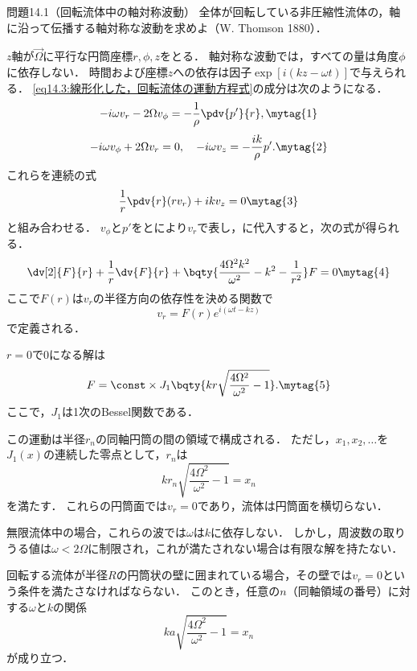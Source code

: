 \begin{mondai}{}{問題14.1（回転流体中の軸対称波動）}
全体が回転している非圧縮性流体の，軸に沿って伝播する軸対称な波動を求めよ（W. Thomson 1880）．
\end{mondai}
\begin{kaitou}
$z$軸が$\vec{\Omega}$に平行な円筒座標$r,\phi,z$をとる．
軸対称な波動では，すべての量は角度$\phi$に依存しない．
時間および座標$z$への依存は因子$\exp[i(kz-\omega t)]$で与えられる．
\eqref{eq14.3:線形化した，回転流体の運動方程式}の成分は次のようになる．
\[
  -i\omega v_r-2\Omega v_\phi = -\frac{1}{\rho} \pdv{p'}{r} ,
  \mytag{1}  
\]
\[
    -i\omega v_\phi + 2\Omega v_r = 0, \quad -i\omega v_z = - \frac{ik}{\rho} p' .
    \mytag{2}
\]
これらを連続の式
\[
    \frac{1}{r} \pdv{r} (rv_r) + ik v_z = 0
    \mytag{3}
\]
と組み合わせる．
$v_\phi$と$p'$をとにより$v_r$で表し，に代入すると，次の式が得られる．
\[
    \dv[2]{F}{r} + \frac{1}{r} \dv{F}{r} + \bqty{ \frac{4\Omega^2k^2}{\omega^2}-k^2-\frac{1}{r^2} } F = 0
    \mytag{4}
\]
ここで$F(r)$は$v_r$の半径方向の依存性を決める関数で
\[
    v_r = F(r) e^{i(\omega t-kz)}
\]
で定義される．

$r=0$で0になる解は
\[
    F = \const \times J_1 \bqty{ kr\sqrt{ \frac{4\Omega^2}{\omega^2} -1 } } .
    \mytag{5}
\]
ここで，$J_1$は1次のBessel関数である．

この運動は半径$r_n$の同軸円筒の間の領域で構成される．
ただし，$x_1, x_2, \ldots$を$J_1(x)$の連続した零点として，$r_n$は
\[
    kr_n \sqrt{ \frac{4\Omega^2}{\omega^2} -1 } = x_n
\]
を満たす．
これらの円筒面では$v_r=0$であり，流体は円筒面を横切らない．

無限流体中の場合，これらの波では$\omega$は$k$に依存しない．
しかし，周波数の取りうる値は$\omega<2\Omega$に制限され，これが満たされない場合は有限な解を持たない．

回転する流体が半径$R$の円筒状の壁に囲まれている場合，その壁では$v_r=0$という条件を満たさなければならない．
このとき，任意の$n$（同軸領域の番号）に対する$\omega$と$k$の関係
\[
    ka \sqrt{ \frac{4\Omega^2}{\omega^2} -1 } = x_n
\]
が成り立つ．

\end{kaitou}




